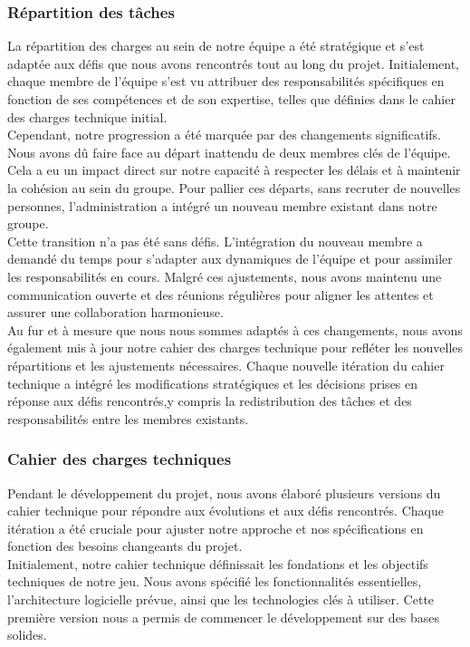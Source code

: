 \subsubsection{Répartition des tâches }


La répartition des charges au sein de notre équipe a été stratégique et s'est adaptée aux défis que nous avons rencontrés tout au long du projet.
Initialement, chaque membre de l'équipe s'est vu attribuer des responsabilités spécifiques en fonction de ses compétences et de son expertise, telles que définies dans le cahier des charges technique initial.
\\

Cependant, notre progression a été marquée par des changements significatifs.
Nous avons dû faire face au départ inattendu de deux membres clés de l'équipe.
Cela a eu un impact direct sur notre capacité à respecter les délais et à maintenir la cohésion au sein du groupe. Pour pallier ces départs, sans recruter de nouvelles personnes, l'administration a intégré un nouveau membre existant dans notre groupe.
\\

Cette transition n'a pas été sans défis.
L'intégration du nouveau membre a demandé du temps pour s'adapter aux dynamiques de l'équipe et pour assimiler les responsabilités en cours.
Malgré ces ajustements, nous avons maintenu une communication ouverte et des réunions régulières pour aligner les attentes et assurer une collaboration harmonieuse.
\\

Au fur et à mesure que nous nous sommes adaptés à ces changements,
nous avons également mis à jour notre cahier des charges technique pour refléter les nouvelles répartitions et les ajustements nécessaires.
Chaque nouvelle itération du cahier technique a intégré les modifications stratégiques et les décisions prises en réponse aux défis rencontrés,y compris la redistribution des tâches et des responsabilités entre les membres existants.
\\

\subsubsection{Cahier des charges techniques}
Pendant le développement du projet, nous avons élaboré plusieurs versions du cahier technique pour répondre aux évolutions et aux défis rencontrés.
Chaque itération a été cruciale pour ajuster notre approche et nos spécifications en fonction des besoins changeants du projet.
\\

Initialement, notre cahier technique définissait les fondations et les objectifs techniques de notre jeu.
Nous avons spécifié les fonctionnalités essentielles, l'architecture logicielle prévue, ainsi que les technologies clés à utiliser.
Cette première version nous a permis de commencer le développement sur des bases solides.
\\




